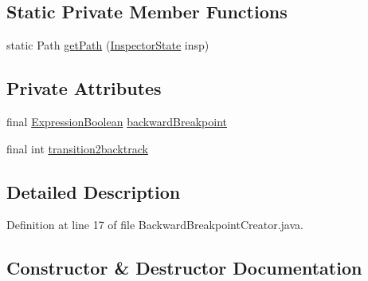 \subsection*{Static Private Member Functions}
\begin{DoxyCompactItemize}
\item 
static Path \hyperlink{classgov_1_1nasa_1_1jpf_1_1inspector_1_1server_1_1pathanalysis_1_1_backward_breakpoint_creator_a8e3d15618550a3067d26457ca3a5fa49}{get\+Path} (\hyperlink{interfacegov_1_1nasa_1_1jpf_1_1inspector_1_1server_1_1expression_1_1_inspector_state}{Inspector\+State} insp)
\end{DoxyCompactItemize}
\subsection*{Private Attributes}
\begin{DoxyCompactItemize}
\item 
final \hyperlink{classgov_1_1nasa_1_1jpf_1_1inspector_1_1server_1_1expression_1_1_expression_boolean}{Expression\+Boolean} \hyperlink{classgov_1_1nasa_1_1jpf_1_1inspector_1_1server_1_1pathanalysis_1_1_backward_breakpoint_creator_a7f9eec1699ee8ea2a995b3d206cf3ff5}{backward\+Breakpoint}
\item 
final int \hyperlink{classgov_1_1nasa_1_1jpf_1_1inspector_1_1server_1_1pathanalysis_1_1_backward_breakpoint_creator_a87651f019518dc70a7a7e0439b3f9ae1}{transition2backtrack}
\end{DoxyCompactItemize}


\subsection{Detailed Description}


Definition at line 17 of file Backward\+Breakpoint\+Creator.\+java.



\subsection{Constructor \& Destructor Documentation}
